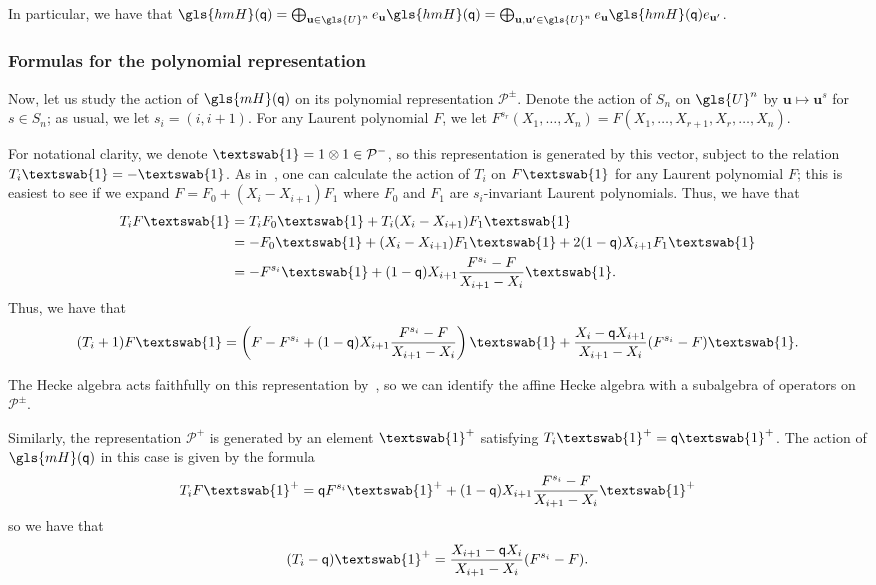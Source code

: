 \documentclass[ALCO,ThmDefs,Unicode,epreuves]{cedram}
\newcommand{\pq}{\mathsf{q}}
\newcommand{\hone}{\text{\textswab{1}}}
\newcommand{\Bu}{\mathbf{u}}
\newcommand{\cP}{\mathcal{P}}
\newcommand{\mH}{\gls{mH}}
\newcommand{\hmH}{\gls{hmH}}
\begin{document}

In particular,
we have that $\hmH(\pq)=\bigoplus_{\Bu\in \gls{U}^n}e_{\Bu}\hmH(\pq)=\bigoplus_{\Bu,\Bu'\in \gls{U}^n}e_{\Bu}\hmH(\pq) e_{\Bu'}$. 

\subsubsection{Formulas for the polynomial representation}
\label{sec:form-polyn-repr}


Now, let us study the action of $\mH(\pq)$ on its polynomial
representation $\cP^{\pm}$. Denote the action of $S_n$ on $\gls{U}^n$ by $\Bu\mapsto \Bu^s$ for $s\in
S_n$; as usual, we let $s_i=(i, i+1)$. For any Laurent polynomial $F$,
we let $F^{s_r}(X_1,\dots,X_n)=F(X_1,\dots,X_{r+1},X_r,\dots, X_n)$. 

For notational clarity, we denote $\hone=1\otimes 1\in \cP^-$, so this
representation is generated by this vector, subject to the relation
$T_i \hone=-\hone$. As in~\cite[(4.3.3)]{MacHecke}, one can calculate the action of $T_i$ on
$F \hone$ 
for any Laurent polynomial $F$; this is easiest to see if we expand
$F=F_0+(X_i-X_{i+1})F_1$ where $F_0$ and $F_1$ are $s_i$-invariant
Laurent polynomials. Thus, we have that 
\begin{align*}
 T_i F\hone&= T_i F_0\hone+T_i(X_i-X_{i+1})F_1\hone\\
 &=-F_0\hone+(X_i-X_{i+1})F_1\hone+2(1-\pq)
X_{i+1}F_1\hone\\
&= -F^{s_i}\hone+ (1-\pq)
X_{i+1}\frac{F^{s_i}-F}{X_{i+1}-X_i}\hone.
\end{align*}
Thus, we have that 
\[(T_i+1) F\hone =\left(F-F^{s_i}+ (1-\pq)
X_{i+1}\frac{F^{s_i}-F}{X_{i+1}-X_i}\right)\hone+\frac{X_i-\pq X_{i+1}}{X_{i+1}-X_i} (F^{s_i}-F)\hone.\]

The Hecke algebra acts faithfully on this
representation by~\cite[(4.3.10)]{MacHecke}, so we can identify the affine Hecke algebra with a
subalgebra of operators on $\cP^\pm$.

Similarly, the representation $\cP^+$ is
generated by an element $\hone^+$ satisfying $T_i\hone^+=\pq \hone^+$.
The action of $\gls{mH}(\pq)$ in this case is given by the formula
\[T_iF\hone^+=\pq F^{s_i}\hone^++(1-\pq)X_{i+1}\frac{F^{s_i}-F}{X_{i+1}-X_i}\hone^+\]
so we have that 
\[(T_i-\pq)\hone^+=\frac{X_{i+1}-\pq X_i}{X_{i+1}-X_i}( F^{s_i}-F).\]
\end{document}
